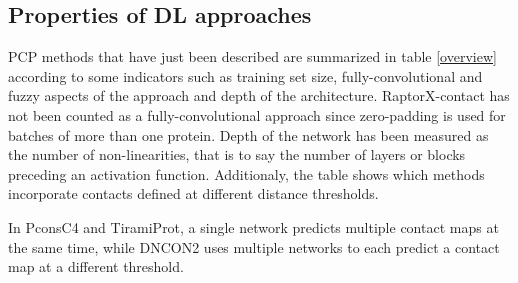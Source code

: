     \subsection{Properties of DL approaches}

        PCP methods that have just been described are summarized in table \ref{overview}
        according to some indicators such as training set size, fully-convolutional and fuzzy
        aspects of the approach and depth of the architecture. RaptorX-contact has not been
        counted as a fully-convolutional approach since zero-padding is used for batches of
        more than one protein. Depth of the network has been measured as the number of non-linearities,
        that is to say the number of layers or blocks preceding an activation function.
        Additionaly, the table shows which methods incorporate contacts defined at different distance
        thresholds.

        \begin{table}[H]
            \centering
            \label{overview}
        \end{table}

        In PconsC4 and TiramiProt, a single network predicts multiple contact maps at the same time, while
        DNCON2 uses multiple networks to each predict a contact map at a different threshold.
